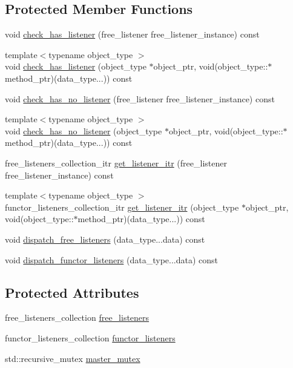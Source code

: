\subsection*{Protected Member Functions}
\begin{DoxyCompactItemize}
\item 
void \hyperlink{classxstd_1_1event_a3b2ec0fe63b51f0a785663ff1cbaf897}{check\-\_\-has\-\_\-listener} (free\-\_\-listener free\-\_\-listener\-\_\-instance) const 
\item 
{\footnotesize template$<$typename object\-\_\-type $>$ }\\void \hyperlink{classxstd_1_1event_a4c8f61670b0145de08594411dab17b49}{check\-\_\-has\-\_\-listener} (object\-\_\-type $\ast$object\-\_\-ptr, void(object\-\_\-type\-::$\ast$method\-\_\-ptr)(data\-\_\-type...)) const 
\item 
void \hyperlink{classxstd_1_1event_a8720bdcd9e0e8588eadbca2750f751e0}{check\-\_\-has\-\_\-no\-\_\-listener} (free\-\_\-listener free\-\_\-listener\-\_\-instance) const 
\item 
{\footnotesize template$<$typename object\-\_\-type $>$ }\\void \hyperlink{classxstd_1_1event_a38563e182cb13274550c790f6c2d48e1}{check\-\_\-has\-\_\-no\-\_\-listener} (object\-\_\-type $\ast$object\-\_\-ptr, void(object\-\_\-type\-::$\ast$method\-\_\-ptr)(data\-\_\-type...)) const 
\item 
free\-\_\-listeners\-\_\-collection\-\_\-itr \hyperlink{classxstd_1_1event_ac5c004598aa8803f901597ade5aec2c2}{get\-\_\-listener\-\_\-itr} (free\-\_\-listener free\-\_\-listener\-\_\-instance) const 
\item 
{\footnotesize template$<$typename object\-\_\-type $>$ }\\functor\-\_\-listeners\-\_\-collection\-\_\-itr \hyperlink{classxstd_1_1event_a56491edd13a1c81766c8c770464e992a}{get\-\_\-listener\-\_\-itr} (object\-\_\-type $\ast$object\-\_\-ptr, void(object\-\_\-type\-::$\ast$method\-\_\-ptr)(data\-\_\-type...)) const 
\item 
void \hyperlink{classxstd_1_1event_ac3a4cf6f6d139f3ab31cd3ca1ebb42e0}{dispatch\-\_\-free\-\_\-listeners} (data\-\_\-type...\-data) const 
\item 
void \hyperlink{classxstd_1_1event_a3c82e7e9e05c4c44e65b32db7090bd3c}{dispatch\-\_\-functor\-\_\-listeners} (data\-\_\-type...\-data) const 
\end{DoxyCompactItemize}
\subsection*{Protected Attributes}
\begin{DoxyCompactItemize}
\item 
free\-\_\-listeners\-\_\-collection \hyperlink{classxstd_1_1event_a045873dfdf4fe07af8421d81592d3275}{free\-\_\-listeners}
\item 
functor\-\_\-listeners\-\_\-collection \hyperlink{classxstd_1_1event_a3e4c0ca4abd96a0af619cdb96e3cfef2}{functor\-\_\-listeners}
\item 
std\-::recursive\-\_\-mutex \hyperlink{classxstd_1_1event_afaaee3e44989122c9e1db6f4d1547de8}{master\-\_\-mutex}
\end{DoxyCompactItemize}


